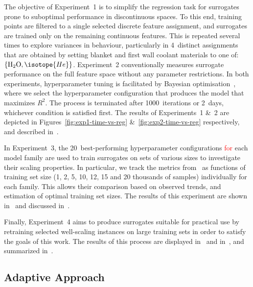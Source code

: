 The objective of Experiment~1 is to simplify the regression task for
surrogates prone to suboptimal performance in discontinuous spaces.
To this end, training points are filtered to a single selected discrete feature
assignment, and surrogates are trained only on the remaining continuous features.
This is repeated several times to explore variances in behaviour,
particularly in 4~distinct assignments that are obtained by setting blanket and
first wall coolant materials to one
of:~$\{\text{H\textsubscript{2}O},\isotope{He}\}$.
Experiment~2 conventionally measures surrogate performance on the full feature
space without any parameter restrictions. In both experiments, hyperparameter tuning is
facilitated by Bayesian optimisation~\cite{movckus1975bayesian}, where we select the
hyperparameter configuration that produces the model that maximizes $R^2$. The
process is terminated after 1000~iterations or 2~days, whichever condition is satisfied first.
The results of Experiments~1 \&~2 are depicted
in Figures~\ref{fig:exp1-time-vs-reg} \&~\ref{fig:exp2-time-vs-reg}
respectively, and described in~.

In Experiment~3, the 20~best-performing hyperparameter configurations
\textcolor{red}{for} each model family are used to train surrogates on sets of various sizes to
investigate their scaling properties. In particular, we track the metrics
from~ as functions of training set size (1, 2, 5, 10, 12, 15 and 20 thousands
of samples) individually for each family. This allows their comparison based on
observed trends, and estimation of optimal training set sizes.
The results of this experiment are shown in~ and discussed
in~.

Finally, Experiment~4 aims
to produce surrogates suitable for practical use by retraining selected
well-scaling instances on large training sets in order to satisfy the goals of this work.
The results of this process are displayed in~ and
in~, and summarized in~.


\subsection{Adaptive Approach}\label{sec:adaptive}

